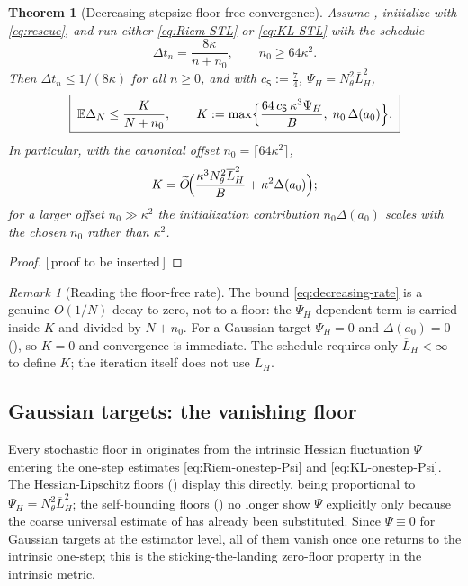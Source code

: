 \documentclass[11pt]{article}
\theoremstyle{plain}
\newtheorem{theorem}{Theorem}[section]
\theoremstyle{definition}
\theoremstyle{remark}
\newtheorem{remark}[remark]{Remark}
\newcommand{\E}{\mathbb{E}}
\newcommand{\LH}{L_H}
\newcommand{\barLH}{\overline{L}_H}
\newcommand{\PROOFHOLE}{{\color{red}\textsf{[\,proof to be inserted\,]}}}
\begin{document}
\begin{theorem}[Decreasing-stepsize floor-free convergence]
\label{thm:decreasing}
Assume , initialize with \eqref{eq:rescue},
and run either \eqref{eq:Riem-STL} or \eqref{eq:KL-STL} with the schedule
\begin{equation}
\label{eq:decreasing-schedule}
    \Delta t_n=\frac{8\kappa}{n+n_0},
    \qquad
    n_0\geq64\kappa^2 .
\end{equation}
Then $\Delta t_n\leq1/(8\kappa)$ for all $n\geq0$, and with $c_{\mathsf S}:=\tfrac74$,
$\Psi_H=N_\theta^2\barLH^2$,
\begin{equation}
\label{eq:decreasing-rate}
    \boxed{\;
    \E\Delta_N\leq\frac{K}{N+n_0},
    \qquad
    K:=\max\Bigl\{\frac{64\,c_{\mathsf S}\,\kappa^3\Psi_H}B,\;n_0\,\Delta(a_0)\Bigr\}.
    \;}
\end{equation}
In particular, with the canonical offset $n_0=\lceil64\kappa^2\rceil$,
\begin{equation}
\label{eq:decreasing-rate-canonical}
    K=\widetilde O\!\Bigl(\frac{\kappa^3N_\theta^2\barLH^2}B+\kappa^2\Delta(a_0)\Bigr);
\end{equation}
for a larger offset $n_0\gg\kappa^2$ the initialization contribution $n_0\Delta(a_0)$ scales with the
chosen $n_0$ rather than $\kappa^2$.
\end{theorem}

\begin{proof}
\PROOFHOLE
\end{proof}

\begin{remark}[Reading the floor-free rate]
\label{rem:decreasing-reading}
The bound \eqref{eq:decreasing-rate} is a genuine $O(1/N)$ decay to zero, not to a floor: the
$\Psi_H$-dependent term is carried inside $K$ and divided by $N+n_0$. For a Gaussian target
$\Psi_H=0$ and $\Delta(a_0)=0$ (), so $K=0$ and convergence is immediate.
The schedule requires only $\barLH<\infty$ to define $K$; the iteration itself does not use $\LH$.
\end{remark}

\subsection{Gaussian targets: the vanishing floor}
\label{sec:gauss-nofloor}

Every stochastic floor in  originates from the intrinsic Hessian
fluctuation $\Psi$ entering the one-step estimates \eqref{eq:Riem-onestep-Psi} and
\eqref{eq:KL-onestep-Psi}. The Hessian-Lipschitz floors
() display this directly, being proportional to
$\Psi_H=N_\theta^2\barLH^2$; the self-bounding floors ()
no longer show $\Psi$ explicitly only because the coarse universal estimate of
 has already been substituted. Since $\Psi\equiv0$ for Gaussian targets at
the estimator level, all of them vanish once one returns to the intrinsic one-step; this is the
sticking-the-landing zero-floor property in the intrinsic metric.
\end{document}
